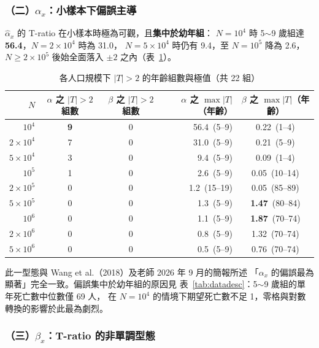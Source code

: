 \documentclass[UTF8, fontset=macnew, a4paper, 12pt]{ctexart}
\begin{document}
\subsubsection{（二）$\alpha_x$：小樣本下偏誤主導}

$\hat\alpha_x$ 的 T-ratio 在小樣本時極為可觀，且\textbf{集中於幼年組}：
$N=10^4$ 時 5$\sim$9 歲組達 \textbf{56.4}，$N=2\times10^4$ 時為 31.0，
$N=5\times10^4$ 時仍有 9.4，至 $N=10^5$ 降為 2.6，
$N\ge2\times10^5$ 後始全面落入 $\pm2$ 之內（表~\ref{tab:tratio}）。

\begin{table}[H]
\centering
\caption{各人口規模下 $|T|>2$ 的年齡組數與極值（共 22 組）}
\small
\begin{tabular}{rccrc}
\toprule
$N$ & $\alpha$ 之 $|T|>2$ 組數 & $\beta$ 之 $|T|>2$ 組數
 & $\alpha$ 之 $\max|T|$（年齡） & $\beta$ 之 $\max|T|$（年齡）\\
\midrule
$10^4$            & \textbf{9} & 0 & 56.4\ (5--9) & 0.22\ (1--4)\\
$2\times10^4$     & 7 & 0 & 31.0\ (5--9) & 0.21\ (5--9)\\
$5\times10^4$     & 3 & 0 & \phantom{0}9.4\ (5--9) & 0.09\ (1--4)\\
$10^5$            & 1 & 0 & \phantom{0}2.6\ (5--9) & 0.05\ (10--14)\\
$2\times10^5$     & 0 & 0 & \phantom{0}1.2\ (15--19) & 0.05\ (85--89)\\
$5\times10^5$     & 0 & 0 & \phantom{0}1.3\ (5--9) & \textbf{1.47}\ (80--84)\\
$10^6$            & 0 & 0 & \phantom{0}1.1\ (5--9) & \textbf{1.87}\ (70--74)\\
$2\times10^6$     & 0 & 0 & \phantom{0}0.8\ (5--9) & 1.32\ (70--74)\\
$5\times10^6$     & 0 & 0 & \phantom{0}0.5\ (5--9) & 0.76\ (70--74)\\
\bottomrule
\end{tabular}
\label{tab:tratio}
\end{table}

此一型態與 Wang et al.（2018）及老師 2026 年 9 月的簡報所述
「$\alpha_x$ 的偏誤最為顯著」完全一致。偏誤集中於幼年組的原因見
表~\ref{tab:datadesc}：5$\sim$9 歲組的單年死亡數中位數僅 69 人，
在 $N=10^4$ 的情境下期望死亡數不足 1，零格與對數轉換的影響於此最為劇烈。

\subsubsection{（三）$\beta_x$：T-ratio 的非單調型態}\label{sec:betaT}
\end{document}

